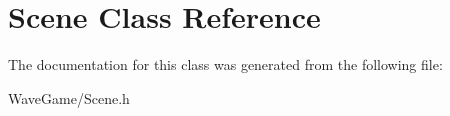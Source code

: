 \hypertarget{class_scene}{}\section{Scene Class Reference}
\label{class_scene}


The documentation for this class was generated from the following file\+:\begin{DoxyCompactItemize}
\item 
Wave\+Game/Scene.\+h\end{DoxyCompactItemize}
